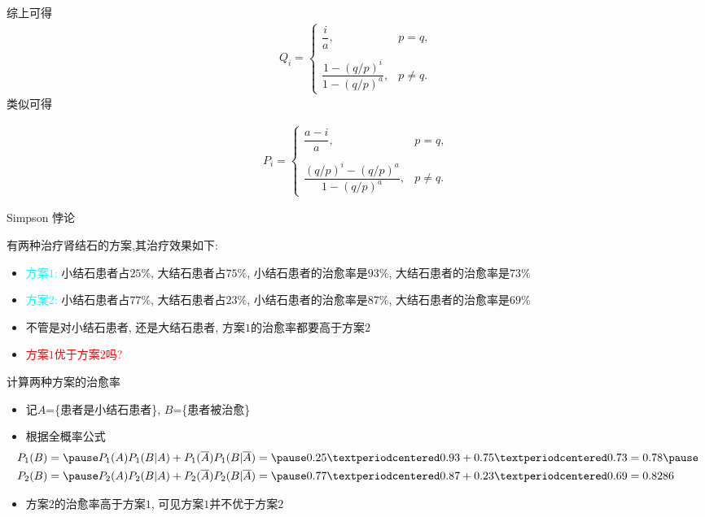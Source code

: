 \documentclass[Prob-All.tex]{subfiles}
\begin{document}
\begin{frame}
	综上可得
	\begin{eqnarray*}
		Q_i=\left\{
		\begin{array}{cl}
			\dfrac{i}{a}, &p=q,\\
			\\
			\dfrac{1-(q/p)^i}{1-(q/p)^a}, &p\neq q.
		\end{array}
		\right.
	\end{eqnarray*}
	类似可得



	\begin{eqnarray*}
		P_i=\left\{
		\begin{array}{cl}
			\dfrac{a-i}{a}, &p=q,\\
			\\
			\dfrac{(q/p)^i-(q/p)^a}{1-(q/p)^a}, &p\neq q.
		\end{array}
		\right.
	\end{eqnarray*}


\end{frame}



\begin{frame}{Simpson 悖论}
	\begin{exam}
		有两种治疗肾结石的方案,其治疗效果如下:
		\begin{itemize}[<+-|alert@+>]
			\item \textcolor{cyan}{方案$1$:} 小结石患者占$25\%$, 大结石患者占$75\%$, 小结石患者的治愈率是$93\%$, 大结石患者的治愈率是$73\%$
			\item \textcolor{cyan}{方案$2$:} 小结石患者占$77\%$, 大结石患者占$23\%$, 小结石患者的治愈率是$87\%$, 大结石患者的治愈率是$69\%$
			\item 不管是对小结石患者, 还是大结石患者, 方案$1$的治愈率都要高于方案$2$
			\item \textcolor{red}{方案$1$优于方案$2$吗?}
		\end{itemize}
	\end{exam}
	\pause
	\begin{jieda}
		计算两种方案的治愈率
		\begin{itemize}[<+-|alert@+>]
			\item 记$A$=\{患者是小结石患者\}, $B$=\{患者被治愈\}
			\item 根据全概率公式\pause
			\begin{align*}
				&\hspace{-0.5cm}P_1(B)=\pause P_1(A)P_1(B|A)+P_1(\overline{A})P_1(B|\overline{A})=\pause 0.25·0.93+0.75·0.73=0.78\pause \\
				&\hspace{-0.5cm} P_2(B)=\pause P_2(A)P_2(B|A)+P_2(\overline{A})P_2(B|\overline{A})=\pause 0.77·0.87+0.23·0.69=0.8286
			\end{align*}
			\item 方案$2$的治愈率高于方案$1$, 可见方案$1$并不优于方案$2$
		\end{itemize}
	\end{jieda}
\end{frame}
\end{document}
